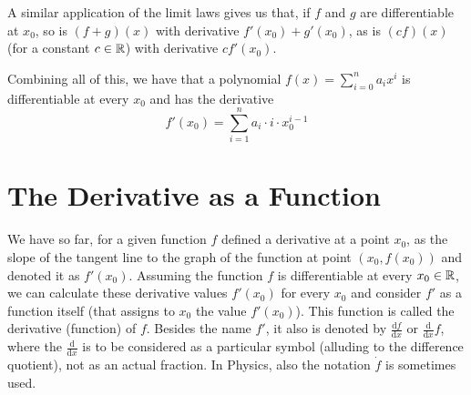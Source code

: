 A similar application of the limit laws gives us that, if $f$ and $g$ are
differentiable at $x_0$, so is  $(f+g)(x)$ with derivative
$f'(x_0)+g'(x_0)$, as is $(cf)(x)$ (for a constant $c\in{\mathbb R}$) with derivative
$cf'(x_0)$.
\smallskip

Combining all of this, we have that a polynomial $f(x)=\sum_{i=0}^n a_ix^i$
is differentiable at every $x_0$ and has the derivative
\[
f'(x_0)=\sum_{i=1}^n a_i\cdot i\cdot x_0^{i-1}
\]

\section{The Derivative as a Function}

We have so far, for a given function $f$ defined a derivative at a point
$x_0$, as the slope of the tangent line to the graph of the function at
point $(x_0,f(x_0))$ and denoted it as $f'(x_0)$. Assuming the function $f$
is differentiable at every
$x_0\in{\mathbb R}$, we can calculate these derivative values $f'(x_0)$ for every
$x_0$ and consider $f'$ as a function itself (that assigns to $x_0$ the
value $f'(x_0)$). This function is called the derivative (function) of $f$.
Besides the name $f'$, it also is denoted by 
$\displaystyle\frac{\mbox{d}f}{\mbox{d}x}$ or
$\displaystyle\frac{\mbox{d}}{\mbox{d}x} f$, where the
$\frac{\mbox{d}}{\mbox{d}x}$ is to be considered as a particular symbol
(alluding to the difference quotient), not
as an actual fraction. In Physics, also the notation $\dot f$ is sometimes
used.

